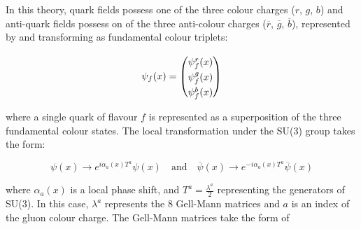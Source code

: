 \documentclass[12pt,a4paper,epsf,portrait,times,epsfig]{report}
\begin{document}
	In this theory, quark fields possess one of the three colour charges ($r$, $g$, $b$) and anti-quark fields possess on of the three anti-colour charges ($\overline{r}$, $\overline{g}$, $\overline{b}$), represented by and transforming as fundamental colour triplets:
	
	\begin{equation}
		\psi_{f}(x) = \begin{pmatrix}
			\psi_{f}^{r}(x) \rule{0pt}{2.6ex}\rule[-0.9ex]{0pt}{0pt}\\
			\psi_{f}^{g}(x) \rule{0pt}{2.6ex}\rule[-0.9ex]{0pt}{0pt}\\
			\psi_{f}^{b}(x) \rule{0pt}{2.6ex}\rule[-0.9ex]{0pt}{0pt}\\
		\end{pmatrix}
	\end{equation}	
	
	where a single quark of flavour $f$ is represented as a superposition of the three fundamental colour states. The local transformation under the SU(3) group takes the form:
	
	\begin{equation}
		\psi(x) \rightarrow e^{i\alpha_{a}(x)T^{a}}\psi(x)
		\quad \mathrm{and} \quad
		\overline{\psi}(x) \rightarrow e^{-i\alpha_{a}(x)T^{a}}\overline{\psi}(x)
	\end{equation}

	where $\alpha_{a}(x)$ is a local phase shift, and $T^{a} = \frac{\lambda^{a}}{2}$ representing the generators of SU(3). In this case, $\lambda^{a}$ represents the 8 Gell-Mann matrices and $a$ is an index of the gluon colour charge. The Gell-Mann matrices take the form of
	
\end{document}
